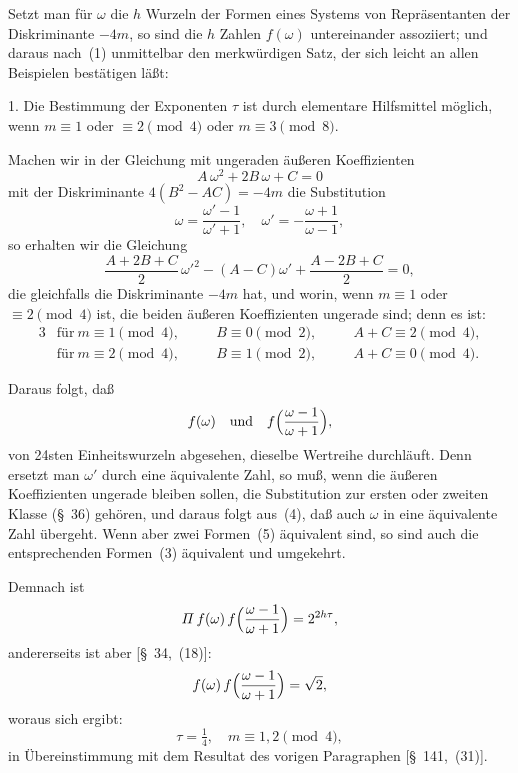 \documentclass[12pt,a4paper]{article}
\theoremstyle{definition}
\begin{document}
Setzt man für $\omega$ die $h$ Wurzeln der Formen eines Systems von 
Repräsentanten der Diskriminante $-4m$, so sind die $h$ Zahlen 
$f(\omega)$ untereinander assoziiert; und daraus nach~(1) unmittelbar den 
merkwürdigen Satz, der sich leicht an allen Beispielen bestätigen läßt:

\begin{center}
\end{center}

1. Die Bestimmung der Exponenten $\tau$ ist durch elementare Hilfsmittel 
möglich, wenn $m \equiv 1$ oder $\equiv 2 \pmod 4$ oder $m \equiv 3 \pmod 8$.

Machen wir in der Gleichung mit ungeraden äußeren Koeffizienten
\begin{equation}
A\,\omega^{2} + 2B\,\omega + C = 0
\end{equation}
mit der Diskriminante $4(B^{2} - AC) = -4m$ die Substitution
\begin{equation}
\omega = \frac{\omega' - 1}{\omega' + 1},\quad
\omega' = -\frac{\omega + 1}{\omega - 1},
\end{equation}
so erhalten wir die Gleichung
\begin{equation}
\frac{A + 2B + C}{2}\,\omega'^{2} - (A - C)\omega' + \frac{A - 2B + C}{2} = 0,
\end{equation}
die gleichfalls die Diskriminante $-4m$ hat, und worin, wenn 
$m \equiv 1$ oder $\equiv 2 \pmod 4$ ist, die beiden äußeren Koeffizienten 
ungerade sind; denn es ist:
\begin{alignat*}{3}
&\text{f\"{u}r}\ m \equiv 1 \pmod 4,\quad &&B \equiv 0 \pmod 2,\quad &&A + C \equiv 2 \pmod 4,\\
&\text{f\"{u}r}\ m \equiv 2 \pmod 4,\quad &&B \equiv 1 \pmod 2,\quad &&A + C \equiv 0 \pmod 4.
\end{alignat*}

Daraus folgt, daß
\[
f(\omega)\quad\text{und}\quad f\Bigl(\frac{\omega - 1}{\omega + 1}\Bigr),
\]
von 24sten Einheitswurzeln abgesehen, dieselbe Wertreihe durchläuft. Denn 
ersetzt man $\omega'$ durch eine äquivalente Zahl, so muß, wenn die äußeren 
Koeffizienten ungerade bleiben sollen, die Substitution zur ersten oder 
zweiten Klasse (\S~36) gehören, und daraus folgt aus~(4), daß auch 
$\omega$ in eine äquivalente Zahl übergeht. Wenn aber zwei Formen~(5) 
äquivalent sind, so sind auch die entsprechenden Formen~(3) äquivalent und 
umgekehrt.

Demnach ist
\[
\varPi\,f(\omega)\,f\Bigl(\frac{\omega - 1}{\omega + 1}\Bigr) = 2^{2h\tau},
\]
andererseits ist aber [\S~34,~(18)]:
\[
f(\omega)\,f\Bigl(\frac{\omega - 1}{\omega + 1}\Bigr) = \sqrt{2},
\]
woraus sich ergibt:
\begin{equation}
\tau = \tfrac{1}{4},\quad m \equiv 1, 2 \pmod 4,
\end{equation}
in Übereinstimmung mit dem Resultat des vorigen Paragraphen [\S~141,~(31)].
\end{document}

